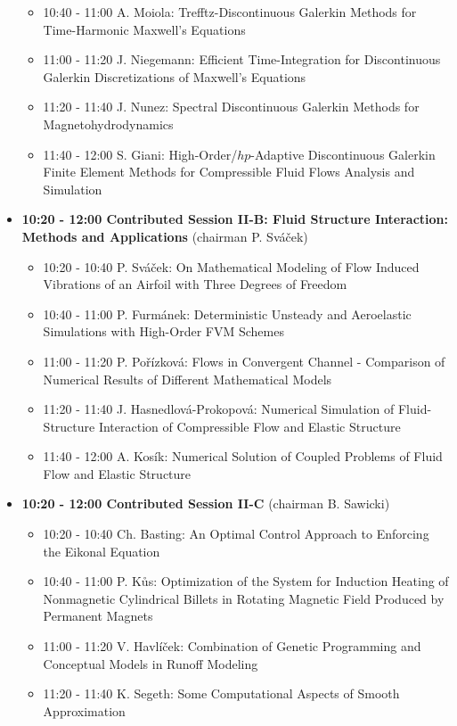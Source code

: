 \documentclass[10pt, A4]{article}%
\begin{document}
\begin{itemize}
\begin{itemize}
    \item 10:40 - 11:00 A. Moiola: Trefftz-Discontinuous Galerkin Methods for Time-Harmonic Maxwell’s Equations
    \item 11:00 - 11:20 J. Niegemann: Efficient Time-Integration for Discontinuous Galerkin Discretizations of Maxwell's Equations
    \item 11:20 - 11:40 J. Nunez: Spectral Discontinuous Galerkin Methods for Magnetohydrodynamics
    \item 11:40 - 12:00 S. Giani: High-Order/$hp$-Adaptive Discontinuous Galerkin Finite Element Methods for Compressible Fluid Flows
Analysis and Simulation
  \end{itemize}
  \item {\bf 10:20 - 12:00 Contributed Session II-B: Fluid Structure Interaction: Methods and Applications} (chairman P. Sv\'{a}\v{c}ek) 
  \begin{itemize}
    \item 10:20 - 10:40 P. Sv\'{a}\v{c}ek: On Mathematical Modeling of Flow Induced Vibrations of an Airfoil with Three Degrees of Freedom
    \item 10:40 - 11:00 P. Furm\'{a}nek: Deterministic Unsteady and Aeroelastic Simulations with High-Order FVM Schemes
    \item 11:00 - 11:20 P. Po\v{r}\'{i}zkov\'{a}: Flows in Convergent Channel - Comparison of Numerical Results of Different Mathematical Models
    \item 11:20 - 11:40 J. Hasnedlov\'{a}-Prokopov\'{a}: Numerical Simulation of Fluid-Structure Interaction of Compressible Flow and Elastic Structure
    \item 11:40 - 12:00 A. Kos\'{i}k: Numerical Solution of Coupled Problems of Fluid Flow and Elastic Structure   
  \end{itemize}
  \newpage
    \item {\bf 10:20 - 12:00 Contributed Session II-C} (chairman B. Sawicki) 
  \begin{itemize}
    \item 10:20 - 10:40 Ch. Basting: An Optimal Control Approach to Enforcing the Eikonal Equation
    \item 10:40 - 11:00 P. K\r{u}s: Optimization of the System for Induction Heating of Nonmagnetic Cylindrical Billets in Rotating Magnetic Field Produced by Permanent Magnets
    \item 11:00 - 11:20 V. Havl\'{i}\v{c}ek: Combination of Genetic Programming and Conceptual Models in Runoff Modeling
    \item 11:20 - 11:40 K. Segeth: Some Computational Aspects of Smooth Approximation

\end{itemize}
\end{itemize}
\end{document}

